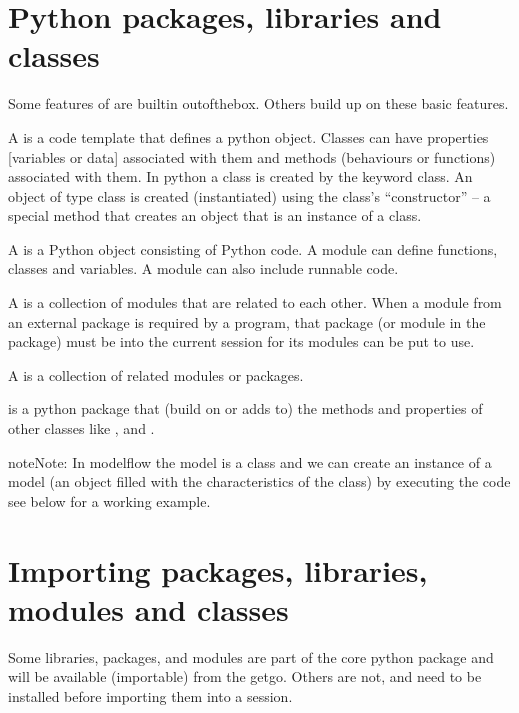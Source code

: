 \documentclass[letterpaper,10pt,english]{jupyterBook}
\begin{document}
\section{Python  packages, libraries and classes}
\label{\detokenize{content/04_PythonEssentials/PythonPandasDataframes:python-packages-libraries-and-classes}}
\sphinxAtStartPar
Some features of  are built\sphinxhyphen{}in out\sphinxhyphen{}of\sphinxhyphen{}the\sphinxhyphen{}box.  Others build up on these basic features.

\sphinxAtStartPar
A  is a code template that defines a python object. Classes can have properties {[}variables or data{]} associated with them and methods (behaviours or functions) associated with them. In python a class is created by the keyword class. An object of type class is created (instantiated) using the class’s “constructor” – a special method that creates an object that is an instance of a class.

\sphinxAtStartPar
A  is a Python object consisting of Python code. A module can define functions, classes and variables. A module can also include runnable code.

\sphinxAtStartPar
A  is a collection of modules that are related to each other. When a module from an external package is required by a program, that package (or module in the package) must  be  into the current session for its modules can be put to use.

\sphinxAtStartPar
A  is a collection of related modules or packages.

\sphinxAtStartPar
{} is a python package that  (build on or adds to) the methods and properties of other  classes like ,  and .

\begin{sphinxadmonition}{note}{Note:}
\sphinxAtStartPar
In modelflow the model is a class and we can create an instance of a model (an object filled with the characteristics of the class) by executing the code  see below for a working example.
\end{sphinxadmonition}


\section{Importing packages, libraries, modules and classes}
\label{\detokenize{content/04_PythonEssentials/PythonPandasDataframes:importing-packages-libraries-modules-and-classes}}
\sphinxAtStartPar
Some libraries, packages, and modules are part of the core python package and will be available (importable) from the get\sphinxhyphen{}go.  Others are not, and need to be installed before importing them into a session.
\end{document}
